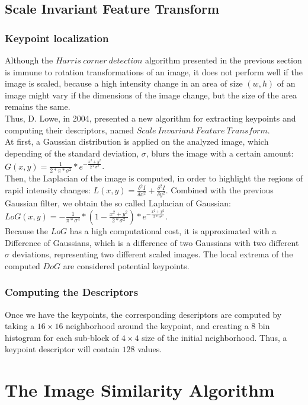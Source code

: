 \documentclass[conference]{IEEEtran}
\begin{document}
\subsection{Scale Invariant Feature Transform}
\subsubsection{Keypoint localization}
Although the $Harris\ corner\ detection$ algorithm presented in the previous section is immune to rotation transformations of an image, it does not perform well if the image is scaled, because a high intensity change in an area of size $(w, h)$ of an image might vary if the dimensions of the image change, but the size of the area remains the same.\\
Thus, D. Lowe, in 2004, presented a new algorithm for extracting keypoints and computing their descriptors, named $Scale\ Invariant\ Feature\ Transform$.\\
At first, a Gaussian distribution is applied on the analyzed image, which depending of the standard deviation, $\sigma$, blurs the image with a certain amount: $G(x, y) = \frac{1}{2 * \pi * \sigma^2} * e^{-\frac{x^2 + y^2}{2 * \sigma^2}}$.\\
Then, the Laplacian of the image is computed, in order to highlight the regions of rapid intensity changes: $L(x, y) = \frac{\delta^2 I}{\delta x^2} + \frac{\delta^2 I}{\delta y^2}$. Combined with the previous Gaussian filter, we obtain the so called Laplacian of Gaussian: $LoG(x, y) = -\frac{1}{\pi * \sigma^4} * \left(1 - \frac{x^2 + y^2}{2 * \sigma^2}\right) * e^{-\frac{x^2 + y^2}{2 * \sigma^2}}$.\\
Because the $LoG$ has a high computational cost, it is approximated with a Difference of Gaussians, which is a difference of two Gaussians with two different $\sigma$ deviations, representing two different scaled images. The local extrema of the computed $DoG$ are considered potential keypoints.
\subsubsection{Computing the Descriptors}
Once we have the keypoints, the corresponding descriptors are computed by taking a $16\times16$ neighborhood around the keypoint, and creating a $8$ bin histogram for each sub-block of $4\times4$ size of the initial neighborhood. Thus, a keypoint descriptor will contain $128$ values.


\section{The Image Similarity Algorithm}
\label{section:algorithm}
\end{document}

